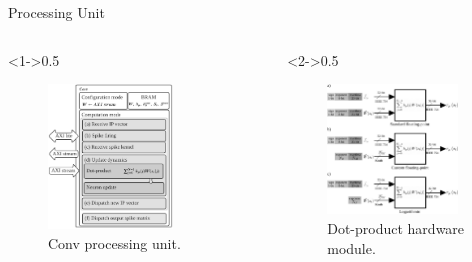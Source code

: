 \begin{frame}{Processing Unit}
	\begin{columns}[c] %
		
		\begin{column}<1->{0.5\textwidth}
			\begin{figure}
				\includegraphics[width=0.7\textwidth]{../chapters/sbs_accelerator/figures/sbs_conv.pdf} %
				\caption{\scriptsize Conv processing unit.}
			\end{figure}
		\end{column}
		
		\begin{column}<2->{0.5\textwidth}
			\begin{figure}
				\includegraphics[width=0.9\textwidth]{../chapters/sbs_accelerator/figures/dot-product_unit.pdf} %
				\caption{\scriptsize Dot-product hardware module.}
			\end{figure}
		\end{column}
		

\end{columns}
\end{frame}
